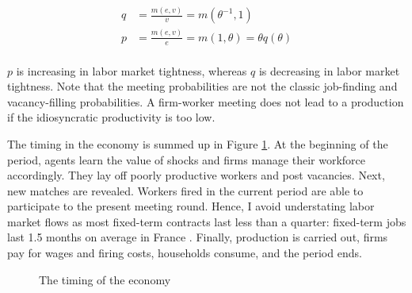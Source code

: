 \begin{align*}
q &= \frac{m\left(e,v\right)}{v} = m \left( \theta^{-1}, 1\right)\\
p &= \frac{m\left(e,v\right)}{e} = m \left( 1, \theta\right) = \theta q(\theta)\\
\end{align*}

$p$ is increasing in labor market tightness, whereas $q$ is decreasing in labor market tightness. Note that the meeting probabilities are not the classic job-finding and vacancy-filling probabilities. A firm-worker meeting does not lead to a production if the idiosyncratic productivity is too low.  

The timing in the economy is summed up in Figure \ref{fig:timing}. At the beginning of the period, agents learn the value of shocks and firms manage their workforce accordingly. They lay off poorly productive workers and post vacancies. Next, new matches are revealed. Workers fired in the current period are able to participate to the present meeting round. Hence, I avoid understating labor market flows as most fixed-term contracts last less than a quarter: fixed-term jobs last 1.5 months on average in France \citep{dares062018}. Finally, production is carried out, firms pay for wages and firing costs, households consume, and the period ends. 

\begin{figure}[H]
\begin{center}
\end{center}
\label{fig:timing}
\caption{The timing of the economy}
\end{figure}

